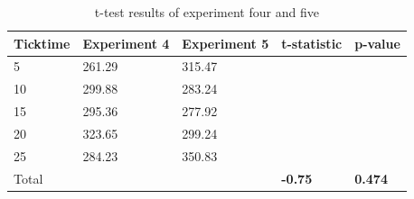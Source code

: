 \begin{table}[!htbp]
\begin{tabular}{| l | l | l | l | l |}
\hline
Ticktime & Experiment 4 & Experiment 5 & t-statistic & p-value \\ \hline
5 & 261.29 & 315.47 &  &  \\ \hline
10 & 299.88 & 283.24 &  &  \\ \hline
15 & 295.36 & 277.92 &  &  \\ \hline
20 & 323.65 & 299.24 &  &  \\ \hline
25 & 284.23 & 350.83 &  &  \\ \hline \hline
Total &  &  & \textbf{-0.75} & \textbf{0.474}\\ \hline
\end{tabular}
\caption{t-test results of experiment four and five}
\label{table:Ttest45}
\end{table}